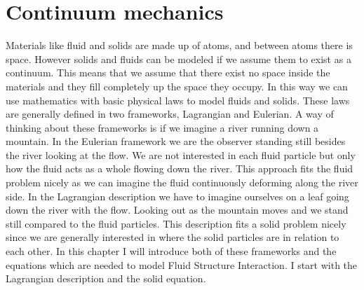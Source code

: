 \chapter{Continuum mechanics}
Materials like fluid and solids are made up of atoms, and between atoms there is space. However solids and fluids can be modeled if we assume them to exist as a continuum. This means that we assume that there exist no space inside the materials and they fill completely up the space they occupy. In this way we can use mathematics with basic physical laws to model fluids and solids. These laws are generally defined in two frameworks, Lagrangian and Eulerian. A way of thinking about these frameworks is if we imagine a river running down a mountain. In the Eulerian framework we are the observer standing still besides the river looking at the flow. We are not interested in each fluid particle but only how the fluid acts as a whole flowing down the river. This approach fits the fluid problem nicely as we can imagine the fluid continuously deforming along the river side.\newline
In the Lagrangian description we have to imagine ourselves on a leaf going down the river with the flow. Looking out as the mountain moves and we stand still compared to the fluid particles. This description fits a solid problem nicely since we are generally interested in where the solid particles are in relation to each other.  
In this chapter I will introduce both of these frameworks and the equations which are needed to model Fluid Structure Interaction. I start with the Lagrangian description and the solid equation. 
%





\begin{comment}
Let $\Omega \in \mathbb{R}^d $ for $d \in \{1,2\}$, be a bounded domain with boundary $ \partial \Omega$. The domain is made up of of two sub domains $ \mathcal{F} $ for the fluid domain, and $\mathcal{S}$ for the solid. The interface between the domains are denoted by $ \Sigma = \mathcal{F} \cap \mathcal{S} $. The reference or initial is denoted by $ \hat{\Sigma} = \hat{\mathcal{F}} \cap \hat{\mathcal{S}}  $ 
\end{comment}

